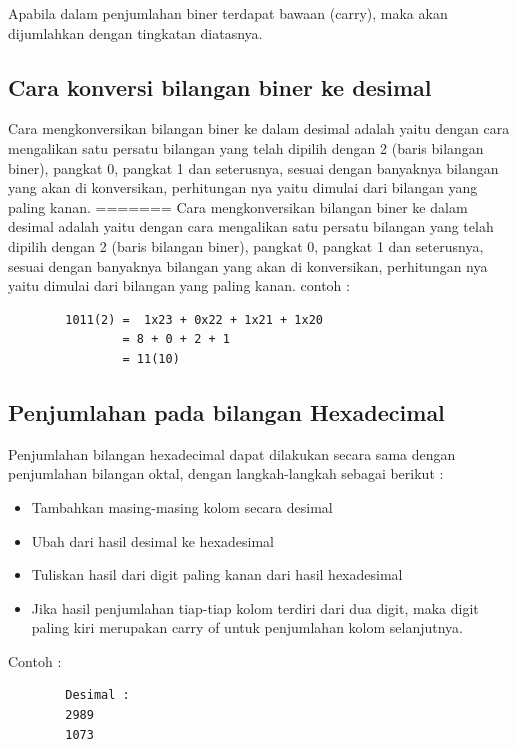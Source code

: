 	Apabila dalam penjumlahan biner terdapat bawaan (carry), maka akan dijumlahkan dengan tingkatan diatasnya.

\subsection {Cara konversi bilangan biner ke desimal}

Cara mengkonversikan bilangan biner ke dalam desimal adalah yaitu dengan cara mengalikan satu persatu bilangan yang telah dipilih dengan 2 (baris bilangan biner), pangkat 0, pangkat 1 dan seterusnya, sesuai dengan banyaknya bilangan yang akan di konversikan, perhitungan nya yaitu dimulai dari bilangan yang paling kanan\cite{wang201140}.
=======
Cara mengkonversikan bilangan biner ke dalam desimal adalah yaitu dengan cara mengalikan satu persatu bilangan yang telah dipilih dengan 2 (baris bilangan biner), pangkat 0, pangkat 1 dan seterusnya, sesuai dengan banyaknya bilangan yang akan di konversikan, perhitungan nya yaitu dimulai dari bilangan yang paling kanan. 
contoh :
	\begin{verbatim}
		1011(2) =  1x23 + 0x22 + 1x21 + 1x20
				= 8 + 0 + 2 + 1
				= 11(10) 
	\end{verbatim}

\subsection{Penjumlahan pada bilangan Hexadecimal}
Penjumlahan bilangan hexadecimal dapat dilakukan secara sama dengan penjumlahan bilangan oktal, dengan langkah-langkah sebagai berikut :
	\begin{itemize}
		\item Tambahkan masing-masing kolom secara desimal
		\item Ubah dari hasil desimal ke hexadesimal
		\item Tuliskan hasil dari digit paling kanan dari hasil hexadesimal
		\item Jika hasil penjumlahan tiap-tiap kolom terdiri dari dua digit, maka digit paling kiri merupakan carry of untuk penjumlahan kolom selanjutnya.
	\end{itemize}
Contoh :
	\begin{verbatim}
		Desimal :
		2989
		1073
	\end{verbatim}

\cite{wang201140}
\cite{brent1970addition}
\cite{detmer2001introduction}
\cite{nurhayati2010aritmatik}
\cite{dosen2013matematika}
